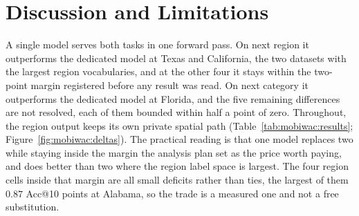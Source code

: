 %
%
\section{Discussion and Limitations}
\label{sec:mobiwac:discussion}

A single model serves both tasks in one forward pass. On next region it outperforms the dedicated
model at Texas and California, the two datasets with the largest region vocabularies, and at the
other four it stays within the two-point margin registered before any result was read. On next
category it outperforms the dedicated model at Florida, and the five remaining differences are not
resolved, each of them bounded within half a point of zero. Throughout, the region output keeps its
own private spatial path (Table~\ref{tab:mobiwac:results}; Figure~\ref{fig:mobiwac:deltas}). The
practical reading is that one model replaces two while staying inside the margin the analysis plan
set as the price worth paying, and does better than two where the region label space is largest.
The four region cells inside that margin are all small deficits rather than ties, the largest of
them $0.87$ Acc@10 points at Alabama, so the trade is a measured one and not a free substitution.

